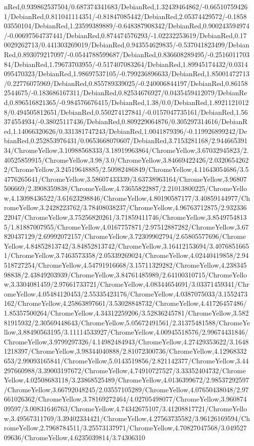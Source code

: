 {\begin{tikzternal}
nRed,0.939862537504/0.687374341683/DebianRed,1.32439464862/-0.665107594261/DebianRed,0.811041114351/-0.81847085442/DebianRed,2.05374429572/-0.185803550104/DebianRed,1.23599389889/-0.648387908342/DebianRed,0.900243594974/-0.00697564737441/DebianRed,0.874474576293/-1.02232253619/DebianRed,0.170029262713/0.441303269019/DebianRed,0.943554629835/-0.537041823499/DebianRed,0.893079217097/-0.0544788599687/DebianRed,0.836608289495/-0.251601170384/DebianRed,1.79673703955/-0.517407083264/DebianRed,1.89945174432/0.0314095470323/DebianRed,1.98697537105/-0.799236896633/DebianRed,1.85001472713/0.22776075969/DebianRed,0.855789339025/-0.240006844197/DebianRed,0.861582544675/-0.183686167311/DebianRed,0.82534676927/0.0435459412079/DebianRed,0.896516821365/-0.984576676415/DebianRed,1.38/0.0/DebianRed,1.89211210128/0.494505812651/DebianRed,0.550274127841/-0.0157047735161/DebianRed,1.56374554934/-0.38025117436/DebianRed,0.809229064876/0.305297314616/DebianRed,1.14066320626/0.331381747243/DebianRed,1.0041879396/-0.119926899242/DebianRed,0.252853976431/0.0653668070607/DebianRed,3.7153281168/2.94466539134/ChromeYellow,3.10988568333/3.18919963864/ChromeYellow,3.67032945823/2.40525859915/ChromeYellow,3.98/3.0/ChromeYellow,3.84669422426/2.03206542622/ChromeYellow,3.24519648885/2.50982486849/ChromeYellow,4.11643054686/3.54776265641/ChromeYellow,3.58607433339/3.63738963164/ChromeYellow,3.96807506669/2.3908359838/ChromeYellow,4.73655822887/2.21013800225/ChromeYellow,4.13098436522/3.61623298846/ChromeYellow,4.80190587177/3.40859144977/ChromeYellow,3.2428223762/3.78408038237/ChromeYellow,4.96763712875/2.93233622047/ChromeYellow,3.75256820261/3.71859411746/ChromeYellow,3.85497548135/1.81887007955/ChromeYellow,4.0167757871/2.97512887282/ChromeYellow,3.67820437129/2.69992072157/ChromeYellow,3.72309902794/2.65805577696/ChromeYellow,4.84852813742/3.84852813742/ChromeYellow,3.16412153694/3.40768516651/ChromeYellow,3.7463573358/2.05339269024/ChromeYellow,4.02440419858/2.94518727254/ChromeYellow,4.54791916668/3.15711329282/ChromeYellow,4.23834598838/2.43849203939/ChromeYellow,3.84761485989/2.64100310715/ChromeYellow,3.3304081459/2.97661733721/ChromeYellow,4.08344654691/3.03371459341/ChromeYellow,4.05484120453/2.55335423176/ChromeYellow,4.0387075033/3.1552473162/ChromeYellow,4.25863897661/3.53028848732/ChromeYellow,4.41726457486/1.85357500264/ChromeYellow,4.34312259206/3.52836245781/ChromeYellow,3.58281915932/2.30569448643/ChromeYellow,5.05672491561/2.31375481588/ChromeYellow,3.88490563195/3.11114533927/ChromeYellow,4.00945518576/2.99674431846/ChromeYellow,3.9799297326/4.14982484943/ChromeYellow,4.27429353622/3.16481218397/ChromeYellow,3.98344040888/2.81072300736/ChromeYellow,4.12968332653/2.99093165841/ChromeYellow,5.0143519856/2.821142377/ChromeYellow,3.44297660988/3.39003197672/ChromeYellow,4.74910727527/3.33352404732/ChromeYellow,4.02508683118/3.23868525489/ChromeYellow,4.0136399672/2.98537292597/ChromeYellow,3.66792048245/2.03557105289/ChromeYellow,4.07650438048/2.97661026362/ChromeYellow,3.78169272464/4.02705498077/ChromeYellow,3.96087409597/3.00831646763/ChromeYellow,4.74342675107/3.41208817721/ChromeYellow,3.49567311769/3.39402334421/ChromeYellow,4.27563735582/3.96126169594/ChromeYellow,2.7968784511/3.25573137971/ChromeYellow,4.70827047568/3.04952709636/ChromeYellow,4.6235039814/3.74306310
\end{tikzternal}}
